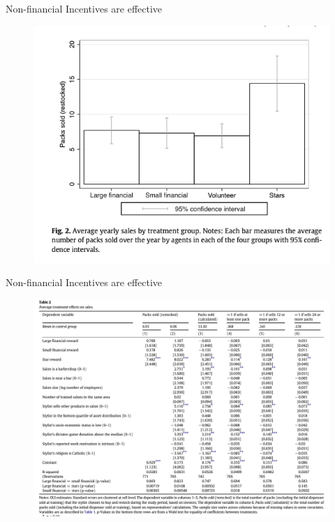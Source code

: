 \documentclass{beamer}
\begin{document}
\begin{frame}{Non-financial Incentives are effective}
    \begin{figure}
        \centering
        \includegraphics[width=\textwidth]{F2.png}
        \label{fig:my_label}
    \end{figure}
\end{frame}


\begin{frame}{Non-financial Incentives are effective}
    \begin{figure}
        \centering
        \includegraphics[width=\textwidth]{T2.png}
        \label{fig:my_label}
    \end{figure}
\end{frame}
\end{document}
